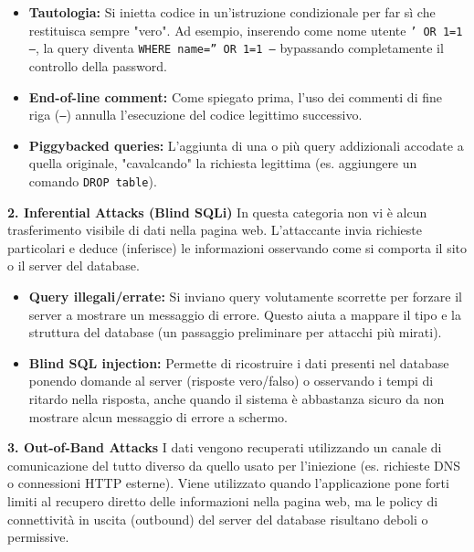 \documentclass{article}
\begin{document}
\begin{itemize}
    \item \textbf{Tautologia:} Si inietta codice in un'istruzione condizionale per far sì che restituisca sempre "vero". Ad esempio, inserendo come nome utente \texttt{' OR 1=1 --}, la query diventa \texttt{WHERE name='' OR 1=1 --} bypassando completamente il controllo della password.
    \item \textbf{End-of-line comment:} Come spiegato prima, l'uso dei commenti di fine riga (\texttt{--}) annulla l'esecuzione del codice legittimo successivo.
    \item \textbf{Piggybacked queries:} L'aggiunta di una o più query addizionali accodate a quella originale, "cavalcando" la richiesta legittima (es. aggiungere un comando \texttt{DROP table}).
\end{itemize}

\vspace{0.3cm}
\noindent \textbf{2. Inferential Attacks (Blind SQLi)}
In questa categoria non vi è alcun trasferimento visibile di dati nella pagina web. L'attaccante invia richieste particolari e deduce (inferisce) le informazioni osservando come si comporta il sito o il server del database.

\begin{itemize}
    \item \textbf{Query illegali/errate:} Si inviano query volutamente scorrette per forzare il server a mostrare un messaggio di errore. Questo aiuta a mappare il tipo e la struttura del database (un passaggio preliminare per attacchi più mirati).
    \item \textbf{Blind SQL injection:} Permette di ricostruire i dati presenti nel database ponendo domande al server (risposte vero/falso) o osservando i tempi di ritardo nella risposta, anche quando il sistema è abbastanza sicuro da non mostrare alcun messaggio di errore a schermo.
\end{itemize}

\vspace{0.3cm}
\noindent \textbf{3. Out-of-Band Attacks}
I dati vengono recuperati utilizzando un canale di comunicazione del tutto diverso da quello usato per l'iniezione (es. richieste DNS o connessioni HTTP esterne). Viene utilizzato quando l'applicazione pone forti limiti al recupero diretto delle informazioni nella pagina web, ma le policy di connettività in uscita (outbound) del server del database risultano deboli o permissive.

\vspace{0.5cm}
\end{document}
